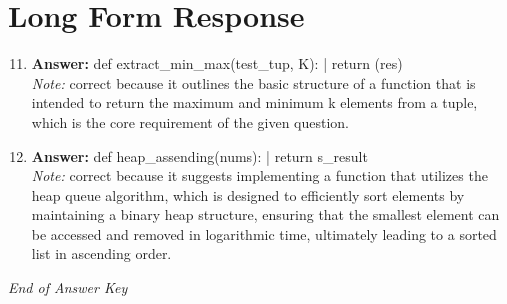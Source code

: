 \documentclass[12pt]{article}
\begin{document}
\section*{Long Form Response}
\begin{enumerate}[label=\arabic*.]
\setcounter{enumi}{10}
\item \textbf{Answer:} def extract\_min\_max(test\_tup, K): | return (res)
\\ \textit{Note:} correct because it outlines the basic structure of a function that is intended to return the maximum and minimum k elements from a tuple, which is the core requirement of the given question.
\item \textbf{Answer:} def heap\_assending(nums): | return s\_result
\\ \textit{Note:} correct because it suggests implementing a function that utilizes the heap queue algorithm, which is designed to efficiently sort elements by maintaining a binary heap structure, ensuring that the smallest element can be accessed and removed in logarithmic time, ultimately leading to a sorted list in ascending order.
\end{enumerate}

\vfill
\noindent\textit{End of Answer Key}
\end{document}
